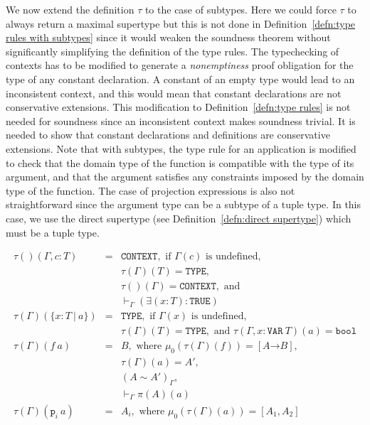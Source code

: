 \documentclass [12pt,twoside]{cslreport}
\newcommand{\thmbox}
   {{\ \hfill\hbox{%
      \vrule width1.0ex height1.0ex
   }\parfillskip 0pt }}
\newcommand{\aro}{\mathord\rightarrow} %
\newcommand{\funtype}[2]{[#1 \aro #2]}
\newcommand{\tupletype}[1]{[#1]}
\newcommand{\tauGamma}[1]{\tau(\Gamma)(#1)}
\newcommand{\proj}[1]{\mathtt{p}_{#1}}
\newcommand{\ttbool}{\mathtt{bool}}
\newcommand{\tttrue}{\mathtt{TRUE}}
\newcommand{\tttype}{\mathtt{TYPE}}
\newcommand{\ttcontext}{\mathtt{CONTEXT}}
\newcommand{\ttvar}{\mathtt{VAR}}
\newcommand{\vbar}{\ |\ }
\newenvironment{Defn}[1]{\begin{definition}[#1]\label{defn:#1}}{
\thmbox\end{definition}}
\begin{document}
We now extend the definition $\tau$ to the case of subtypes.  Here we
could force $\tau$ to always return a maximal supertype but this is not
done in Definition~\ref{defn:type rules with subtypes}  since it
would weaken the soundness theorem without significantly simplifying the
definition of the type rules.  The typechecking of contexts has to be
modified to generate a {\em nonemptiness\/} proof obligation for the type of
any constant declaration.  A constant of an empty type would lead to an
inconsistent context, and this would mean that constant declarations are
not conservative extensions.  This modification to
Definition~\ref{defn:type rules} is not needed for soundness since an
inconsistent context makes soundness trivial.  It is needed to show that
constant declarations and definitions are conservative extensions.  Note
that with subtypes, the type rule for an application is modified to check
that the domain type of the function is compatible with the type of its
argument, and that the argument satisfies any constraints imposed by the
domain type of the function.  The case of projection expressions is also
not straightforward since the argument type can be a subtype of a tuple
type.  In this case, we use the direct supertype (see
Definition~\ref{defn:direct supertype}) which must be a tuple type.
%
\begin{Defn}{type rules with subtypes}
\begin{eqnarray*}
  \tau()(\Gamma, c : T) & = & \ttcontext, \mbox{ if } \Gamma(c)
\mbox{ is undefined},\\& &
\tauGamma{T} =   \tttype{},\\& &
      \tau()(\Gamma) = \ttcontext,  \mbox{ and } \\& & 
   \vdash_\Gamma (\exists (x: T) : \tttrue)\\
%
  \tauGamma{\{x : T \vbar a\}} & = & \tttype{}, \mbox{ if } \Gamma(x)
\mbox{ is undefined}, \\& & 
    \tauGamma{T} = \tttype{}, \mbox{ and } \tau(\Gamma, x : \ttvar{}\ T)(a) = \ttbool \\
%
  \tauGamma{f\ a} & = &  B, \mbox{ where } \mu_0(\tauGamma{f}) =
                                                 \funtype{A}{B},\\&  & 
                   			\tauGamma{a} = A',\\ & &
					(A \sim A')_\Gamma,\\& & 
                                        \vdash_\Gamma \pi(A)(a) \\
 \tauGamma{\proj{i}~a} & = & A_i, \mbox{ where } \mu_0(\tauGamma{a}) =
\tupletype{A_1, A_2}
\end{eqnarray*}
\end{Defn}
\end{document}
